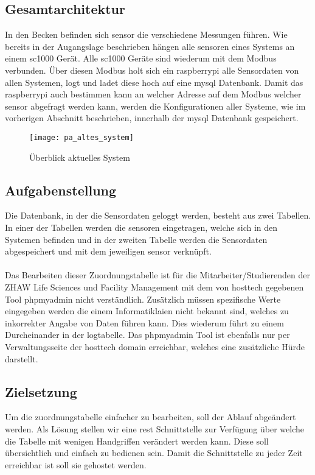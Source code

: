\documentclass[../main.tex]{subfiles}
\begin{document}
	\subsection{Gesamtarchitektur}
	In den Becken befinden sich \gls{sensor} die verschiedene Messungen führen. Wie bereits in der Augangslage beschrieben hängen alle \gls{sensor}en eines Systems an einem \gls{sc1000} Gerät. Alle \gls{sc1000} Geräte sind wiederum mit dem Modbus verbunden. Über diesen Modbus holt sich ein \gls{raspberrypi} alle Sensordaten von allen Systemen, logt und ladet diese hoch auf eine \gls{mysql} Datenbank. Damit das \gls{raspberrypi} auch bestimmen kann an welcher Adresse auf dem Modbus welcher \gls{sensor} abgefragt werden kann, werden die Konfigurationen aller Systeme, wie im vorherigen Abschnitt beschrieben, innerhalb der \gls{mysql} Datenbank gespeichert.
	\begin{figure}[H]
		\centering
		\texttt{[image: pa\_altes\_system]}
		\caption{Überblick aktuelles System}
		\label{fig:pa_altes_system}
	\end{figure}
	
	\subsection{Aufgabenstellung}
	Die Datenbank, in der die Sensordaten geloggt werden, besteht aus zwei Tabellen. In einer der Tabellen werden die \gls{sensor}en eingetragen, welche sich in den Systemen befinden und in der zweiten Tabelle werden die Sensordaten abgespeichert und mit dem jeweiligen \gls{sensor} verknüpft. \\
	\\	
	Das Bearbeiten dieser Zuordnungstabelle ist für die Mitarbeiter/Studierenden der ZHAW Life Sciences und Facility Management mit dem von \gls{hosttech} gegebenen Tool \gls{phpmyadmin} nicht verständlich. Zusätzlich müssen spezifische Werte eingegeben werden die einem Informatiklaien nicht bekannt sind, welches zu inkorrekter Angabe von Daten führen kann. Dies wiederum führt zu einem Durcheinander in der \gls{logtabelle}. 
	Das \gls{phpmyadmin} Tool ist ebenfalls nur per Verwaltungsseite der \gls{hosttech} \gls{domain} erreichbar, welches eine zusätzliche Hürde darstellt.
	
	\subsection{Zielsetzung}
	Um die \gls{zuordnungstabelle} einfacher zu bearbeiten, soll der Ablauf abgeändert werden. Als Lösung stellen wir eine \gls{rest} Schnittstelle zur Verfügung über welche die Tabelle mit wenigen Handgriffen verändert werden kann. 
	Diese soll übersichtlich und einfach zu bedienen sein. Damit die Schnittstelle zu jeder Zeit erreichbar ist soll sie gehostet werden.
\end{document}
